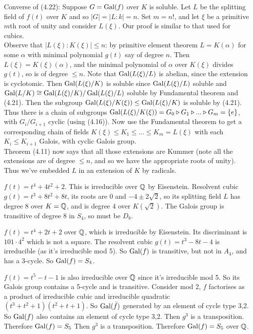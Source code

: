 \documentclass[a4paper]{article}
\begin{document}
Converse of (4.22): Suppose $G = \operatorname{Gal}(f)$ over $K$ is soluble. Let $L$ be the splitting field of $f(t)$ over $K$ and so $|G| = |L:k| =n$. Set $m=n!$, and let $\xi$ be a primitive $m$th root of unity and consider $L(\xi)$. Our proof is similar to that used for cubics.\\
Observe that $|L(\xi):K(\xi)| \leq n$: by primitive element theorem $L=K(\alpha)$ for some $\alpha$ with minimal polynomial $g(t)$ say of degree $n$. Then $L(\xi) = K(\xi)(\alpha)$, and the minimal polynomial of $\alpha$ over $K(\xi)$ divides $g(t)$, so is of degree $\leq n$. Note that $\operatorname{Gal}(L(\xi)/L)$ is abelian, since the extension is cyclotomic. Then $\operatorname{Gal}(L(\xi)/K)$ is soluble since $\operatorname{Gal}(L(\xi) / L)$ soluble and $\operatorname{Gal}(L/K) \cong \operatorname{Gal}(L(\xi)/K) / \operatorname{Gal}(L(\xi)/L)$ soluble by Fundamental theorem and (4.21). Then the subgroup $\operatorname{Gal}(L(\xi)/K(\xi)) \leq \operatorname{Gal}(L(\xi)/K)$ is soluble by (4.21). Thus there is a chain of subgroups $\operatorname{Gal}(L(\xi)/K(\xi)) = G_0 \triangleright G_1 \triangleright ... \triangleright G_m = \{e\}$, with $G_i/G_{i+1}$ cyclic (using (4.16)). Now use the Fundamental theorem to get a corresponding chain of fields $K(\xi) \leq K_1 \leq ... \leq K_m = L(\xi)$ with each $K_i \leq K_{i+1}$ Galois, with cyclic Galois group.\\
Theorem (4.11) now says that all those extensions are Kummer (note all the extensions are of degree $\leq n$, and so we have the appropriate roots of unity). Thus we've embedded $L$ in an extension of $K$ by radicals.

\begin{eg}
$f(t) = t^4+4t^2+2$. This is irreducible over $\mathbb{Q}$ by Eisenstein. Resolvent cubic $g(t) = t^3+8t^2+8t$, its roots are 0 and $-4 \pm 2\sqrt{2}$, so its splitting field $L$ has degree 8 over $K=\mathbb{Q}$, and is degree 4 over $K(\sqrt{2})$. The Galois group is transitive of degree 8 in $S_4$, so must be $D_8$.
\end{eg}

\begin{eg}
$f(t) = t^4+2t+2$ over $\mathbb{Q}$, which is irreducible by Eisenstein. Its discriminant is $101 \cdot 4^2$ which is not a square. The resolvent cubic $g(t) = t^3-8t-4$ is irreducible (as it's irreducible mod 5). So $\operatorname{Gal}(f)$ is transitive, but not in $A_4$, and has a 3-cycle. So $\operatorname{Gal}(f) = S_4$.
\end{eg}

\begin{eg}
$f(t) = t^5-t-1$ is also irreducible over $\mathbb{Q}$ since it's irreducible mod 5. So its Galois group contains a 5-cycle and is transitive. Consider mod 2, $f$ factorises as a product of irreducible cubic and irreducible quadratic $(t^3+t^2+1)(t^2+t+1)$. So $\operatorname{Gal}(\bar{f})$ generated by an element of cycle type 3,2. So $\operatorname{Gal}(f)$ also contains an element of cycle type 3,2. Then $g^3$ is a transposition. Therefore $\operatorname{Gal}(f) = S_5$ Then $g^3$ is a transposition. Therefore $\operatorname{Gal}(f) = S_5$ over $\mathbb{Q}$.
\end{eg}
\end{document}
